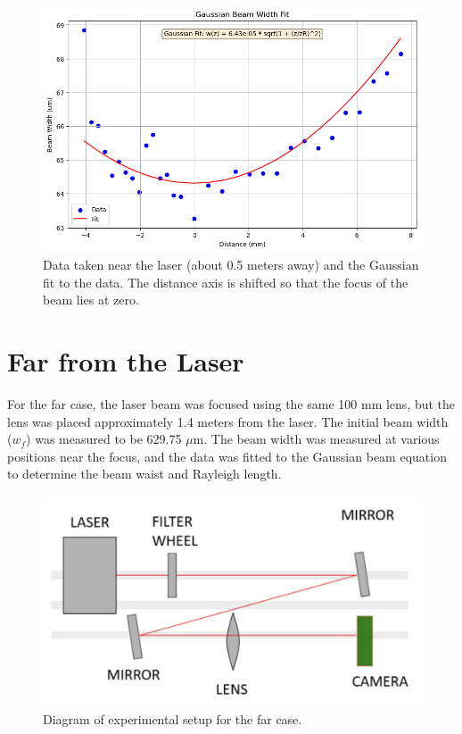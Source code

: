 \documentclass[12pt]{article}
\begin{document}
\begin{figure}[H]
    \centering
    \includegraphics[width=1\linewidth]{Near_fit.png}
    \caption{Data taken near the laser (about 0.5 meters away) and the Gaussian fit to the data. The distance axis is shifted so that the focus of the beam lies at zero.}
    \label{fig:near-fit}
\end{figure}

\section{Far from the Laser}
For the far case, the laser beam was focused using the same 100 mm lens, but the lens was placed approximately 1.4 meters from the laser. The initial beam width (\(w_f\)) was measured to be 629.75 \(\mu\)m. The beam width was measured at various positions near the focus, and the data was fitted to the Gaussian beam equation to determine the beam waist and Rayleigh length.

\begin{figure}[H]
    \centering
    \includegraphics[width=1\linewidth]{Far_Diagram.png}
    \caption{Diagram of experimental setup for the far case.}
    \label{fig:far-setup}
\end{figure}
\end{document}
